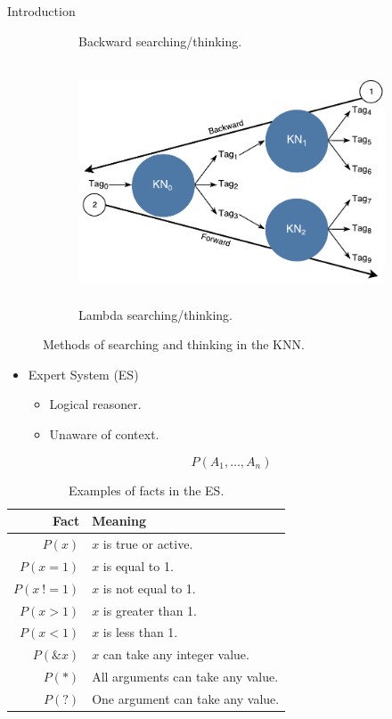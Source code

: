 \documentclass[final]{beamer} %
\begin{document}
\begin{frame}
\begin{columns}
\begin{column}{.3\textwidth}
{\begin{block}{Introduction}
\begin{figure}[!htb]
\begin{subfigure}[!htb]{0.49\columnwidth}
							\caption{Backward searching/thinking.}
							\label{think_backwards}
						\end{subfigure}
						\begin{subfigure}[!htb]{0.49\columnwidth}
							\centering
							\includegraphics[height=2.8in]{figures/lambda_search.pdf}
							\caption{Lambda searching/thinking.}
							\label{think_lambda}
						\end{subfigure}
						\caption{Methods of searching and thinking in the KNN.}
					\end{figure}
					
					\begin{itemize}
						\item Expert System (ES)
						\begin{itemize}
							\item Logical reasoner.
							\item Unaware of context.
						\end{itemize}
					\end{itemize}
				
					\begin{equation} \label{eq:fact}
						P(A_1, \ldots, A_n)
					\end{equation}
					
					\begin{table}[!htb]
						\centering
						\caption{Examples of facts in the ES.}
						\begin{tabular}{r | l}
							\textbf{Fact} & \textbf{Meaning} \\ \hline
							$P(x)$ & $x$ is true or active.\\
							$P(x = 1)$ & $x$ is equal to 1. \\
							$P(x \ != 1)$ & $x$ is not equal to 1. \\
							$P(x > 1)$ & $x$ is greater than 1. \\
							$P(x < 1)$ & $x$ is less than 1. \\
							$P(\&x)$ & $x$ can take any integer value. \\
							$P(*)$ & All arguments can take any value. \\
							$P(?)$ & One argument can take any value. \\
						\end{tabular}
						\label{table:fact_predicates}
					\end{table}
					

\end{block}}
\end{column}
\end{columns}
\end{frame}
\end{document}
